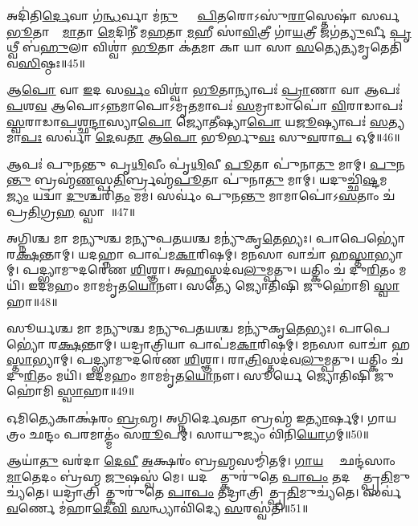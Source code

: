 𑌅𑌦𑌿॑𑌤𑌿\ul{𑌰𑍍𑌦𑍇}𑌵𑌾 𑌗॑\ul{𑌨𑍍𑌧}𑌰𑍍𑌵𑌾 𑌮॑\ul{𑌨𑍁}𑌷𑍍𑌯𑌾𑌃᳚ \ul{𑌪𑌿}𑌤𑌰𑍋𑌽𑌸𑍁॑\ul{𑌰𑌾}𑌸𑍍𑌤𑍇𑌷𑌾॑ 𑌸𑌰𑍍𑌵\ul{𑌭𑍂}𑌤𑌾𑌨𑌾𑌂᳚ \ul{𑌮𑌾}𑌤𑌾 \ul{𑌮𑍇}𑌦𑌿𑌨𑍀॑ 𑌮\ul{𑌹}𑌤𑌾 \ul{𑌮}𑌹𑍀 𑌸𑌾॑\ul{𑌵𑌿}𑌤𑍍𑌰𑍀 𑌗𑌾॑\ul{𑌯}𑌤𑍍𑌰𑍀 𑌜𑌗॑\ul{𑌤𑍍𑌯𑍁}𑌰𑍍𑌵𑍀 \ul{𑌪𑍃}𑌥𑍍𑌵𑍀 𑌬॑\ul{𑌹𑍁}𑌲𑌾 𑌵𑌿𑌶𑍍𑌵𑌾॑ \ul{𑌭𑍂}𑌤𑌾 𑌕॑\ul{𑌤}𑌮𑌾 𑌕𑌾 𑌯𑌾 𑌸𑌾 \ul{𑌸}𑌤𑍍𑌯𑍇\ul{𑌤𑍍𑌯}𑌮𑍃𑌤𑍇𑌤𑌿॑ 𑌵\ul{𑌸𑌿}𑌷𑍍𑌠𑌃॥45॥
\anuvakamend

𑌆\ul{𑌪𑍋} 𑌵𑌾 \ul{𑌇}𑌦 𑌸\ul{𑌰𑍍𑌵𑌂} 𑌵𑌿𑌶𑍍𑌵𑌾॑ \ul{𑌭𑍂}𑌤𑌾𑌨𑍍𑌯𑌾𑌪𑌃॑ \ul{𑌪𑍍𑌰𑌾}𑌣𑌾 𑌵𑌾 𑌆𑌪𑌃॑ \ul{𑌪}𑌶\ul{𑌵} 𑌆𑌪𑍋𑌽\ul{𑌨𑍍𑌨}𑌮𑌾𑌪𑍋𑌽𑌮𑍃॑\ul{𑌤}𑌮𑌾𑌪𑌃॑ \ul{𑌸}𑌮𑍍𑌰𑌾𑌡𑌾𑌪𑍋॑ \ul{𑌵𑌿}𑌰𑌾𑌡𑌾𑌪𑌃॑ \ul{𑌸𑍍𑌵}𑌰𑌾𑌡𑌾\ul{𑌪}𑌶𑍍𑌛\ul{𑌨𑍍𑌦𑌾}\ul{}𑌸𑍍𑌯𑌾\ul{𑌪𑍋} 𑌜𑍍𑌯𑍋\ul{𑌤𑍀}\ul{}𑌷𑍍𑌯𑌾\ul{𑌪𑍋} 𑌯\ul{𑌜𑍂}\ul{}𑌷𑍍𑌯𑌾𑌪𑌃॑ \ul{𑌸}𑌤𑍍𑌯𑌮𑌾\ul{𑌪𑌃} 𑌸𑌰𑍍𑌵𑌾॑ \ul{𑌦𑍇}𑌵\ul{𑌤𑌾} 𑌆\ul{𑌪𑍋} 𑌭𑍂𑌰𑍍𑌭𑍁\ul{𑌵𑌃} 𑌸𑍁\ul{𑌵}𑌰𑌾\ul{𑌪} 𑌓𑌮𑍍॥46॥
\anuvakamend

𑌆𑌪𑌃॑ 𑌪𑍁𑌨𑌨𑍍𑌤𑍁 𑌪𑍃\ul{𑌥𑌿}𑌵𑍀𑌂 𑌪𑍃॑\ul{𑌥𑌿}𑌵𑍀 \ul{𑌪𑍂}𑌤𑌾 𑌪𑍁॑𑌨𑌾\ul{𑌤𑍁} 𑌮𑌾𑌮𑍍। 
\ul{𑌪𑍁}𑌨\ul{𑌨𑍍𑌤𑍁} 𑌬𑍍𑌰𑌹𑍍𑌮॑\ul{𑌣}𑌸𑍍𑌪\ul{𑌤𑌿}𑌰𑍍𑌬𑍍𑌰𑌹𑍍𑌮॑\ul{𑌪𑍂}𑌤𑌾 𑌪𑍁॑𑌨𑌾\ul{𑌤𑍁} 𑌮𑌾𑌮𑍍। 
𑌯𑌦𑍁𑌚𑍍𑌛𑌿॑\ul{𑌷𑍍𑌟}𑌮𑌭𑍋᳚\ul{𑌜𑍍𑌯𑌂} 𑌯𑌦𑍍𑌵𑌾॑ \ul{𑌦𑍁}𑌶𑍍𑌚𑌰𑌿॑\ul{𑌤𑌂} 𑌮𑌮॑। 
𑌸𑌰𑍍𑌵𑌂॑ 𑌪𑍁𑌨\ul{𑌨𑍍𑌤𑍁} 𑌮𑌾𑌮𑌾𑌪𑍋॑𑌽\ul{𑌸}𑌤𑌾𑌂 𑌚॑ 𑌪𑍍𑌰\ul{𑌤𑌿}𑌗𑍍𑌰\ul{𑌹}\ul{} 𑌸𑍍𑌵𑌾𑌹𑌾᳚॥47॥
\anuvakamend


𑌅𑌗𑍍𑌨𑌿𑌶𑍍𑌚 𑌮𑌾 𑌮𑌨𑍍𑌯𑍁𑌶𑍍𑌚 𑌮𑌨𑍍𑌯𑍁𑌪𑌤𑌯𑌶𑍍𑌚 𑌮𑌨𑍍𑌯𑍁॑𑌕𑍃\ul{𑌤𑍇}𑌭𑍍𑌯𑌃। 
𑌪𑌾𑌪𑍇𑌭𑍍𑌯𑍋॑ 𑌰\ul{𑌕𑍍𑌷}𑌨𑍍𑌤𑌾𑌮𑍍। 
𑌯𑌦𑌹𑍍𑌨𑌾 𑌪𑌾𑌪॑𑌮\ul{𑌕𑌾}𑌰𑌿𑌷𑌮𑍍। 
𑌮𑌨𑌸𑌾 𑌵𑌾𑌚𑌾॑ 𑌹\ul{𑌸𑍍𑌤𑌾}𑌭𑍍𑌯𑌾𑌮𑍍। 
𑌪𑌦𑍍𑌭𑍍𑌯𑌾𑌮𑍁𑌦𑌰𑍇॑𑌣 \ul{𑌶𑌿}𑌶𑍍𑌞𑌾। 
𑌅\ul{𑌹}𑌸𑍍𑌤𑌦॑𑌵\ul{𑌲𑍁}𑌮𑍍𑌪𑌤𑍁। 
𑌯𑌤𑍍𑌕𑌿𑌂 𑌚॑ 𑌦𑍁\ul{𑌰𑌿}𑌤𑌂 𑌮𑌯𑌿॑। 
𑌇𑌦𑌮𑌹𑌂 𑌮𑌾𑌮𑌮𑍃॑𑌤\ul{𑌯𑍋}𑌨𑍗। 
𑌸𑌤𑍍𑌯𑍇 𑌜𑍍𑌯𑍋𑌤𑌿𑌷𑌿 𑌜𑍁𑌹𑍋॑𑌮𑌿 \ul{𑌸𑍍𑌵𑌾}𑌹𑌾॥48॥
\anuvakamend


𑌸𑍂𑌰𑍍𑌯𑌶𑍍𑌚 𑌮𑌾 𑌮𑌨𑍍𑌯𑍁𑌶𑍍𑌚 𑌮𑌨𑍍𑌯𑍁𑌪𑌤𑌯𑌶𑍍𑌚 𑌮𑌨𑍍𑌯𑍁॑𑌕𑍃\ul{𑌤𑍇}𑌭𑍍𑌯𑌃। 
𑌪𑌾𑌪𑍇𑌭𑍍𑌯𑍋॑ 𑌰\ul{𑌕𑍍𑌷}𑌨𑍍𑌤𑌾𑌮𑍍। 
𑌯𑌦𑍍𑌰𑌾𑌤𑍍𑌰𑌿𑌯𑌾 𑌪𑌾𑌪॑𑌮\ul{𑌕𑌾}𑌰𑌿𑌷𑌮𑍍। 
𑌮𑌨𑌸𑌾 𑌵𑌾𑌚𑌾॑ 𑌹\ul{𑌸𑍍𑌤𑌾}𑌭𑍍𑌯𑌾𑌮𑍍। 
𑌪𑌦𑍍𑌭𑍍𑌯𑌾𑌮𑍁𑌦𑌰𑍇॑𑌣 \ul{𑌶𑌿}𑌶𑍍𑌞𑌾। 
𑌰𑌾\ul{𑌤𑍍𑌰𑌿}𑌸𑍍𑌤𑌦॑𑌵\ul{𑌲𑍁}𑌮𑍍𑌪𑌤𑍁। 
𑌯𑌤𑍍𑌕𑌿𑌂 𑌚॑ 𑌦𑍁\ul{𑌰𑌿}𑌤𑌂 𑌮𑌯𑌿॑। 
𑌇𑌦𑌮𑌹𑌂 𑌮𑌾𑌮𑌮𑍃॑𑌤\ul{𑌯𑍋}𑌨𑍗। 
𑌸𑍂𑌰𑍍𑌯𑍇 𑌜𑍍𑌯𑍋𑌤𑌿𑌷𑌿 𑌜𑍁𑌹𑍋॑𑌮𑌿 \ul{𑌸𑍍𑌵𑌾}𑌹𑌾॥49॥
\anuvakamend

𑌓𑌮𑌿𑌤𑍍𑌯𑍇𑌕𑌾𑌕𑍍𑌷॑𑌰𑌂 \ul{𑌬𑍍𑌰}𑌹𑍍𑌮। 
𑌅𑌗𑍍𑌨𑌿𑌰𑍍𑌦𑍇𑌵𑌤𑌾 𑌬𑍍𑌰𑌹𑍍𑌮॑ 𑌇\ul{𑌤𑍍𑌯𑌾}𑌰𑍍\mbox{}𑌷𑌮𑍍। 
𑌗𑌾𑌯𑌤𑍍𑌰𑌂 𑌛𑌨𑍍𑌦𑌂 𑌪𑌰𑌮𑌾𑌤𑍍𑌮𑌂॑ 𑌸\ul{𑌰𑍂}𑌪𑌮𑍍। 
𑌸𑌾𑌯𑍁𑌜𑍍𑌯𑌂 𑌵𑌿॑𑌨𑌿\ul{𑌯𑍋}𑌗𑌮𑍍॥50॥
\anuvakamend

𑌆𑌯𑌾॑\ul{𑌤𑍁} 𑌵𑌰॑𑌦𑌾 \ul{𑌦𑍇}\ul{𑌵𑍀} \ul{𑌅}𑌕𑍍𑌷𑌰𑌂॑ 𑌬𑍍𑌰\ul{𑌹𑍍𑌮}𑌸𑌮𑍍𑌮𑌿॑𑌤𑌮𑍍। 
\ul{𑌗𑌾}\ul{𑌯}𑌤𑍍𑌰𑍀𑌂᳚ 𑌛𑌨𑍍𑌦॑𑌸𑌾𑌂 \ul{𑌮𑌾}𑌤𑍇𑌦𑌂 𑌬𑍍𑌰॑𑌹𑍍𑌮 \ul{𑌜𑍁}𑌷𑌸𑍍𑌵॑ 𑌮𑍇। 
𑌯𑌦𑌹𑍍𑌨𑌾᳚𑌤𑍍𑌕𑍁𑌰𑍁॑𑌤𑍇 \ul{𑌪𑌾}\ul{𑌪𑌂} 𑌤𑌦𑌹𑍍𑌨𑌾᳚𑌤𑍍𑌪𑍍𑌰\ul{𑌤𑌿}𑌮𑍁𑌚𑍍𑌯॑𑌤𑍇। 
𑌯𑌦𑍍𑌰𑌾𑌤𑍍𑌰𑌿𑌯𑌾᳚𑌤𑍍𑌕𑍁𑌰𑍁॑𑌤𑍇 \ul{𑌪𑌾}\ul{𑌪𑌂} 𑌤𑌦𑍍𑌰𑌾𑌤𑍍𑌰𑌿𑌯𑌾᳚𑌤𑍍𑌪𑍍𑌰\ul{𑌤𑌿}𑌮𑍁𑌚𑍍𑌯॑𑌤𑍇। 
𑌸𑌰𑍍𑌵॑ \ul{𑌵}𑌰𑍍𑌣𑍇 𑌮॑𑌹𑌾\ul{𑌦𑍇}\ul{𑌵𑌿} \ul{𑌸}𑌨𑍍𑌧𑍍𑌯𑌾𑌵𑌿॑𑌦𑍍𑌯𑍇 \ul{𑌸}𑌰𑌸𑍍𑌵॑𑌤𑌿॥51॥ 
\anuvakamend

